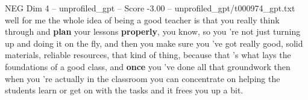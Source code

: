 \begin{textsample}{NEG Dim 4 – unprofiled\_gpt – Score -3.00 – unprofiled\_gpt/t000974\_gpt.txt}  \label{ex:f4_neg_022}
well for me the whole idea of being a good teacher is that you really think through and \textbf{plan} your lessons \textbf{properly}, you know, so you ’re not just turning up and doing it on the fly, and then you make sure you ’ve got really good, solid materials, reliable resources, that kind of thing, because that ’s what lays the foundations of a good class, and \textbf{once} you ’ve done all that groundwork then when you ’re actually in the classroom you can concentrate on helping the students learn or get on with the tasks and it frees you up a bit.

\end{textsample}
